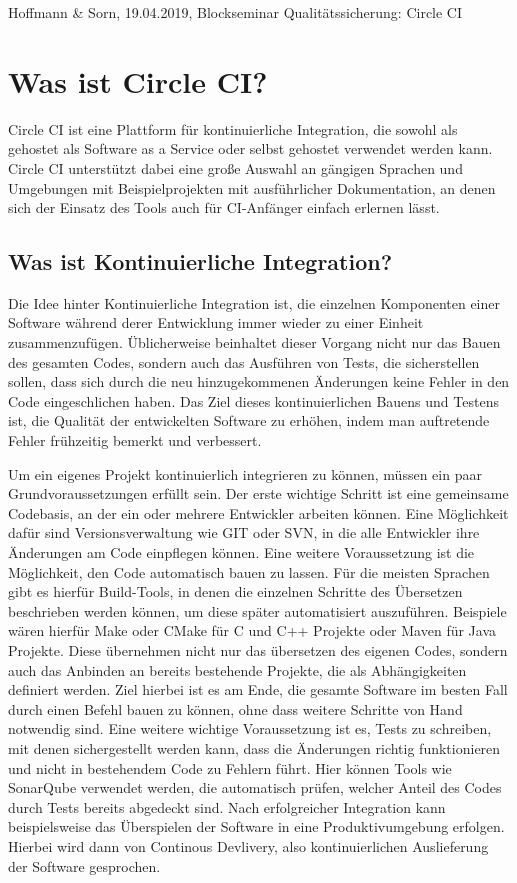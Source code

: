 \documentclass[11pt]{article}
\begin{document}
Hoffmann \& Sorn, 19.04.2019, Blockseminar Qualitätssicherung: Circle CI

\section {Was ist Circle CI?}

Circle CI ist eine Plattform für kontinuierliche Integration, die sowohl als gehostet als Software as a Service oder selbst gehostet verwendet werden kann. Circle CI unterstützt dabei eine große Auswahl an gängigen Sprachen und Umgebungen mit Beispielprojekten mit ausführlicher Dokumentation, an denen sich der Einsatz des Tools auch für CI-Anfänger einfach erlernen lässt.

\subsection {Was ist Kontinuierliche Integration?}

Die Idee hinter Kontinuierliche Integration ist, die einzelnen Komponenten einer Software während derer Entwicklung immer wieder zu einer Einheit zusammenzufügen. Üblicherweise beinhaltet dieser Vorgang nicht nur das Bauen des gesamten Codes, sondern auch das Ausführen von Tests, die sicherstellen sollen, dass sich durch die neu hinzugekommenen Änderungen keine Fehler in den Code eingeschlichen haben. Das Ziel dieses kontinuierlichen Bauens und Testens ist, die Qualität der entwickelten Software zu erhöhen, indem man auftretende Fehler frühzeitig bemerkt und verbessert.

Um ein eigenes Projekt kontinuierlich integrieren zu können, müssen ein paar Grundvoraussetzungen erfüllt sein. Der erste wichtige Schritt ist eine gemeinsame Codebasis, an der ein oder mehrere Entwickler arbeiten können. Eine Möglichkeit dafür sind Versionsverwaltung wie GIT oder SVN, in die alle Entwickler ihre Änderungen am Code einpflegen können. Eine weitere Voraussetzung ist die Möglichkeit, den Code automatisch bauen zu lassen. Für die meisten Sprachen gibt es hierfür Build-Tools, in denen die einzelnen Schritte des Übersetzen beschrieben werden können, um diese später automatisiert auszuführen. Beispiele wären hierfür Make oder CMake für C und C++ Projekte oder Maven für Java Projekte. Diese übernehmen nicht nur das übersetzen des eigenen Codes, sondern auch das Anbinden an bereits bestehende Projekte, die als Abhängigkeiten definiert werden. Ziel hierbei ist es am Ende, die gesamte Software im besten Fall durch einen Befehl bauen zu können, ohne dass weitere Schritte von Hand notwendig sind.
Eine weitere wichtige Voraussetzung ist es, Tests zu schreiben, mit denen sichergestellt werden kann, dass die Änderungen richtig funktionieren und nicht in bestehendem Code zu Fehlern führt. Hier können Tools wie SonarQube verwendet werden, die automatisch prüfen, welcher Anteil des Codes durch Tests bereits abgedeckt sind. Nach erfolgreicher Integration kann beispielsweise das Überspielen der Software in eine Produktivumgebung erfolgen. Hierbei wird dann von Continous Devlivery, also kontinuierlichen Auslieferung der Software gesprochen.
\end{document}
